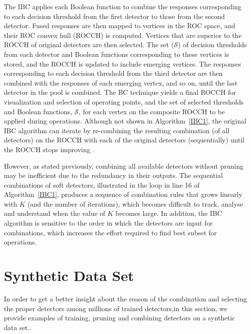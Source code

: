 



The IBC applies each Boolean function to combine the responses corresponding to each decision threshold from the first detector to those from the second detector.
Fused responses are then mapped to vertices in the ROC space, and their ROC convex hull (ROCCH) is computed.
Vertices that are superior to the ROCCH of original detectors are then selected.
The set ($\mathcal{S}$) of decision thresholds from each detector and Boolean functions corresponding to these vertices is stored, and the ROCCH is updated to include emerging vertices.
The responses corresponding to each decision threshold from the third detector are then combined with the responses of each emerging vertex, and so on, until the last detector in the pool is combined.
The BC technique yields a final ROCCH for visualization and selection of operating points, and the set of selected thresholds and Boolean functions, $\mathcal{S}$, for each vertex on the composite ROCCH to be applied during operations.
Although not shown in Algorithm~\ref{IBC1}, the original IBC algorithm can iterate by re-combining the resulting combination (of all detectors) on the ROCCH with each of the original detectors (sequentially) until the ROCCH stops improving \cite{Khreich2010-ICPR}.

However, as stated previously, combining all available detectors without pruning may be inefficient due to the redundancy in their outputs.
The sequential combinations of soft detectors, illustrated in the loop in line 16 of Algorithm~\ref{IBC1}, produces a sequence of combination rules that grows linearly with $K$ (and the number of iterations), which becomes difficult to track, analyse and understand when the value of $K$ becomes large.
In addition, the IBC algorithm is sensitive to the order in which the detectors are input for combinations, which increases the effort required to find best subset for operations.

 \section{Synthetic Data Set}
\label{sec:synthetic}
In order to get a better insight about the reason of the combination and selecting the proper detectors among millions of trained detectors,in this section, we provide examples of training, pruning and combining detectors on a synthetic data set.. 

